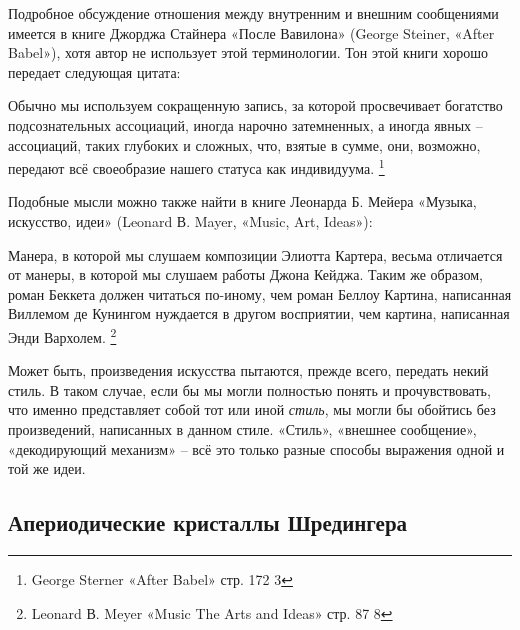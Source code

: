 \documentclass[../main.tex]{subfiles}
\begin{document}
Подробное обсуждение отношения между внутренним и внешним сообщениями имеется в книге Джорджа Стайнера «После Вавилона» (George Steiner, «After Babel»), хотя автор не использует этой терминологии. Тон этой книги хорошо передает следующая цитата:

Обычно мы используем сокращенную запись, за которой просвечивает богатство подсознательных ассоциаций, иногда нарочно затемненных, а иногда явных \--- ассоциаций, таких глубоких и сложных, что, взятые в сумме, они, возможно, передают всё своеобразие нашего статуса как индивидуума. \footnote{George Sterner «After Babel» стр. 172 3}

Подобные мысли можно также найти в книге Леонарда Б. Мейера «Музыка, искусство, идеи» (Leonard В. Mayer, «Music, Art, Ideas»):

Манера, в которой мы слушаем композиции Элиотта Картера, весьма отличается от манеры, в которой мы слушаем работы Джона Кейджа. Таким же образом, роман Беккета должен читаться по-иному, чем роман Беллоу Картина, написанная Виллемом де Кунингом нуждается в другом восприятии, чем картина, написанная Энди Вархолем. \footnote{Leonard В. Meyer «Music The Arts and Ideas» стр. 87 8}

Может быть, произведения искусства пытаются, прежде всего, передать некий стиль. В таком случае, если бы мы могли полностью понять и прочувствовать, что именно представляет собой тот или иной \emph{стиль}, мы могли бы обойтись без произведений, написанных в данном стиле. «Стиль», «внешнее сообщение», «декодирующий механизм» \--- всё это только разные способы выражения одной и той же идеи.


\subsection{Апериодические кристаллы Шредингера}
\end{document}
